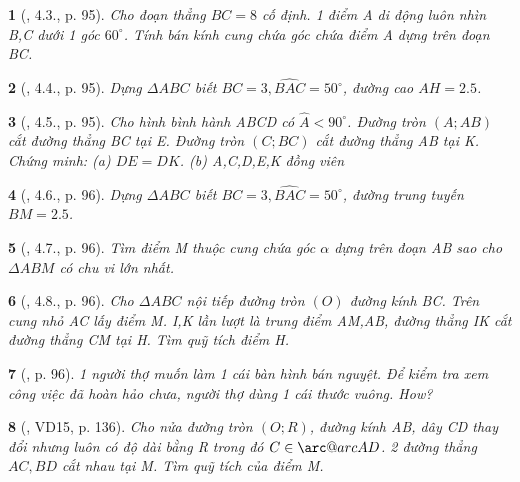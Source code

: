 \documentclass{article}
\makeatletter
\newcommand{\arc@char}{{\usefont{U}{tipa}{m}{n}\symbol{62}}}%
\newcommand{\arc}[1]{\mathpalette\arc@arc{#1}}
\newcommand{\arc@arc}[2]{%
	\sbox0{$\m@th#1#2$}%
	\vbox{
		\hbox{\resizebox{\wd0}{\height}{\arc@char}}
		\nointerlineskip
		\box0
	}%
}
\newtheorem{baitoan}{}
\makeatother
\begin{document}
\begin{baitoan}[\cite{Binh_boi_duong_Toan_9_tap_2}, 4.3., p. 95]
	Cho đoạn thẳng $BC = 8$ cố định. 1 điểm A di động luôn nhìn B,C dưới 1 góc $60^\circ$. Tính bán kính cung chứa góc chứa điểm A dựng trên đoạn BC.
\end{baitoan}

\begin{baitoan}[\cite{Binh_boi_duong_Toan_9_tap_2}, 4.4., p. 95]
	Dựng $\Delta ABC$ biết $BC = 3,\widehat{BAC} = 50^\circ$, đường cao $AH = 2.5$.
\end{baitoan}

\begin{baitoan}[\cite{Binh_boi_duong_Toan_9_tap_2}, 4.5., p. 95]
	Cho hình bình hành ABCD có $\widehat{A} < 90^\circ$. Đường tròn $(A;AB)$ cắt đường thẳng BC tại E. Đường tròn $(C;BC)$ cắt đường thẳng AB tại K. Chứng minh: (a) $DE = DK$. (b) A,C,D,E,K đồng viên
\end{baitoan}

\begin{baitoan}[\cite{Binh_boi_duong_Toan_9_tap_2}, 4.6., p. 96]
	Dựng $\Delta ABC$ biết $BC = 3,\widehat{BAC} = 50^\circ$, đường trung tuyến $BM = 2.5$.
\end{baitoan}

\begin{baitoan}[\cite{Binh_boi_duong_Toan_9_tap_2}, 4.7., p. 96]
	Tìm điểm M thuộc cung chứa góc $\alpha$ dựng trên đoạn AB sao cho $\Delta ABM$ có chu vi lớn nhất.
\end{baitoan}

\begin{baitoan}[\cite{Binh_boi_duong_Toan_9_tap_2}, 4.8., p. 96]
	Cho $\Delta ABC$ nội tiếp đường tròn $(O)$ đường kính BC. Trên cung nhỏ AC lấy điểm M. I,K lần lượt là trung điểm AM,AB, đường thẳng IK cắt đường thẳng CM tại H. Tìm quỹ tích điểm H.
\end{baitoan}

\begin{baitoan}[\cite{Binh_boi_duong_Toan_9_tap_2}, p. 96]
	1 người thợ muốn làm 1 cái bàn hình bán nguyệt. Để kiểm tra xem công việc đã hoàn hảo chưa, người thợ dùng 1 cái thước vuông. How?
\end{baitoan}

\begin{baitoan}[\cite{Tuyen_Toan_9_old}, VD15, p. 136]
	Cho nửa đường tròn $(O;R)$, đường kính AB, dây CD thay đổi nhưng luôn có độ dài bằng R trong đó $C\in\arc{AD}$. 2 đường thẳng $AC,BD$ cắt nhau tại M. Tìm quỹ tích của điểm M.
\end{baitoan}
\end{document}
